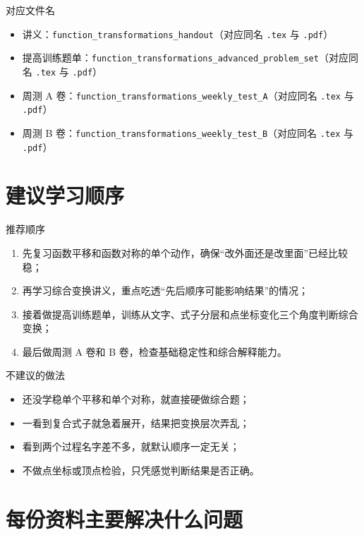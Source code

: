 \documentclass[11pt,a4paper,fontset=fandol]{ctexart}
\begin{document}
\begin{infobox}{对应文件名}
\begin{itemize}
  \item 讲义：\texttt{function\_transformations\_handout}（对应同名 \texttt{.tex} 与 \texttt{.pdf}）
  \item 提高训练题单：\texttt{function\_transformations\_advanced\_problem\_set}（对应同名 \texttt{.tex} 与 \texttt{.pdf}）
  \item 周测 A 卷：\texttt{function\_transformations\_weekly\_test\_A}（对应同名 \texttt{.tex} 与 \texttt{.pdf}）
  \item 周测 B 卷：\texttt{function\_transformations\_weekly\_test\_B}（对应同名 \texttt{.tex} 与 \texttt{.pdf}）
\end{itemize}
\end{infobox}

\section{建议学习顺序}

\begin{goalbox}{推荐顺序}
\begin{enumerate}
  \item 先复习函数平移和函数对称的单个动作，确保“改外面还是改里面”已经比较稳；
  \item 再学习综合变换讲义，重点吃透“先后顺序可能影响结果”的情况；
  \item 接着做提高训练题单，训练从文字、式子分层和点坐标变化三个角度判断综合变换；
  \item 最后做周测 A 卷和 B 卷，检查基础稳定性和综合解释能力。
\end{enumerate}
\end{goalbox}

\begin{warnbox}{不建议的做法}
\begin{itemize}
  \item 还没学稳单个平移和单个对称，就直接硬做综合题；
  \item 一看到复合式子就急着展开，结果把变换层次弄乱；
  \item 看到两个过程名字差不多，就默认顺序一定无关；
  \item 不做点坐标或顶点检验，只凭感觉判断结果是否正确。
\end{itemize}
\end{warnbox}

\section{每份资料主要解决什么问题}
\end{document}
